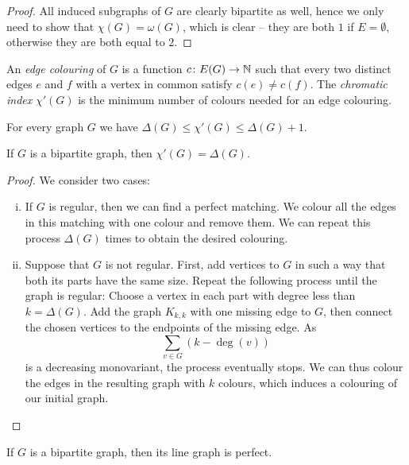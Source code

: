 \begin{proof}
All induced subgraphs of $G$ are clearly bipartite as well, hence
we only need to show that $\chi(G) = \omega(G)$, which is clear --
they are both $1$ if $E = \emptyset$, otherwise they are both equal
to $2$.
\end{proof}

\begin{definicija}
An \emph{edge colouring} of $G$ is a function
$c \colon E(G) \to \mathbb{N}$ such that every two distinct edges $e$ and
$f$ with a vertex in common satisfy $c(e) \ne c(f)$. The
\emph{chromatic index} $\chi'(G)$ is the
minimum number of colours needed for an edge colouring.
\end{definicija}

\begin{izrek}[Vizing]
For every graph $G$ we have
$\Delta(G) \leq \chi'(G) \leq \Delta(G)+1$.
\end{izrek}

\begin{izrek}
If $G$ is a bipartite graph, then $\chi'(G) = \Delta(G)$.
\end{izrek}

\begin{proof}
We consider two cases:

\begin{enumerate}[i)]
\item If $G$ is regular, then we can find a perfect matching. We
colour all the edges in this matching with one colour and remove
them. We can repeat this process $\Delta(G)$ times to obtain the
desired colouring.

\item Suppose that $G$ is not regular. First, add vertices to $G$
in such a way that both its parts have the same size. Repeat the
following process until the graph is regular: Choose a vertex in
each part with degree less than $k = \Delta(G)$. Add the graph
$K_{k,k}$ with one missing edge to $G$, then connect the chosen
vertices to the endpoints of the missing edge. As
\[
\sum_{v \in G} (k - \deg(v))
\]
is a decreasing monovariant, the process eventually stops. We can
thus colour the edges in the resulting graph with $k$ colours,
which induces a colouring of our initial graph. \qedhere
\end{enumerate}
\end{proof}

\begin{izrek}
If $G$ is a bipartite graph, then its line graph is perfect.
\end{izrek}

